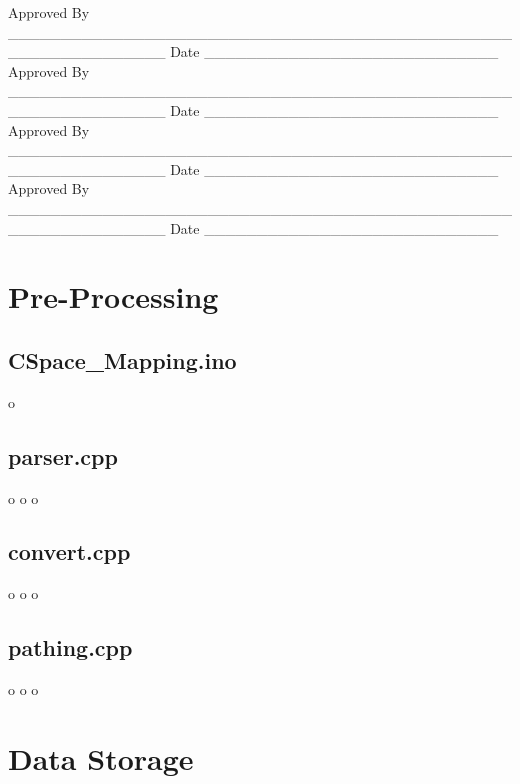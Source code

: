\documentclass[letterpaper,10pt]{article}
\newenvironment{bottompar}{\par\vspace*{\fill}}{\clearpage}
\begin{document}
\begin{bottompar}
Approved By
\_\_\_\_\_\_\_\_\_\_\_\_\_\_\_\_\_\_\_\_\_\_\_\_\_\_\_\_\_\_\_\_\_\_\_\_\_\_\_\_\_\_\_\_\_\_\_\_\_\_\_\_\_\_\_\_\_\_\_\_\_\_\_
Date \_\_\_\_\_\_\_\_\_\_\_\_\_\_\_\_\_\_\_\_\_\_\_\_\_\_\_\_ \\


Approved By
\_\_\_\_\_\_\_\_\_\_\_\_\_\_\_\_\_\_\_\_\_\_\_\_\_\_\_\_\_\_\_\_\_\_\_\_\_\_\_\_\_\_\_\_\_\_\_\_\_\_\_\_\_\_\_\_\_\_\_\_\_\_\_
Date \_\_\_\_\_\_\_\_\_\_\_\_\_\_\_\_\_\_\_\_\_\_\_\_\_\_\_\_ \\


Approved By
\_\_\_\_\_\_\_\_\_\_\_\_\_\_\_\_\_\_\_\_\_\_\_\_\_\_\_\_\_\_\_\_\_\_\_\_\_\_\_\_\_\_\_\_\_\_\_\_\_\_\_\_\_\_\_\_\_\_\_\_\_\_\_
Date \_\_\_\_\_\_\_\_\_\_\_\_\_\_\_\_\_\_\_\_\_\_\_\_\_\_\_\_ \\


Approved By
\_\_\_\_\_\_\_\_\_\_\_\_\_\_\_\_\_\_\_\_\_\_\_\_\_\_\_\_\_\_\_\_\_\_\_\_\_\_\_\_\_\_\_\_\_\_\_\_\_\_\_\_\_\_\_\_\_\_\_\_\_\_\_
Date \_\_\_\_\_\_\_\_\_\_\_\_\_\_\_\_\_\_\_\_\_\_\_\_\_\_\_\_ \\
\end{bottompar}

\clearpage
\tableofcontents
\clearpage

\section{Pre-Processing}
\subsection{CSpace\_Mapping.ino}
\clearpage
o
\clearpage
\subsection{parser.cpp}
\clearpage
o
\clearpage
o
\clearpage
o
\clearpage
\subsection{convert.cpp}
\clearpage
o
\clearpage
o
\clearpage
o
\clearpage
\subsection{pathing.cpp}
\clearpage
o
\clearpage
o
\clearpage
o
\clearpage

\section{Data Storage}
\end{document}
